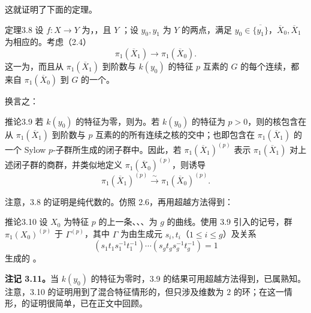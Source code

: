 这就证明了下面的定理。
\begin{SGAresult}{定理}{3.8}
设 $f:X\to Y$ 为，，且 $Y$ ；设 $y_0,y_1$ 为 $Y$ 的两点，满足 $y_0\in\overline{\{y_1\}}$，$\overline X_0,\overline X_1$ 为相应的。考虑（2.4）
\[
\pi_1(\overline X_1)\longrightarrow\pi_1(\overline X_0).
\]
这一为，而且从 $\pi_1(\overline X_1)$ 到阶数与 $k(y_0)$ 的特征 $p$ 互素的 $G$ 的每个连续，都来自 $\pi_1(\overline X_0)$ 到 $G$ 的一个。
\end{SGAresult}
换言之：
\begin{SGAresult}{推论}{3.9}
若 $k(y_0)$ 的特征为零，则为。若 $k(y_0)$ 的特征为 $p>0$，则的核包含在从 $\pi_1(\overline X_1)$ 到阶数与 $p$ 互素的的所有连续之核的交中；也即包含在  $\pi_1(\overline X_1)$ 的一个 Sylow $p$-子群所生成的闭子群中。因此，若 $\pi_1(\overline X_1)^{(p)}$ 表示 $\pi_1(\overline X_1)$ 对上述闭子群的商群，并类似地定义 $\pi_1(\overline X_0)^{(p)}$，则诱导
\[
\pi_1(\overline X_1)^{(p)}\xrightarrow{\sim}\pi_1(\overline X_0)^{(p)}.
\]
\end{SGAresult}
注意，3.8 的证明是纯代数的。仿照 2.6，再用超越方法得到：
\begin{SGAresult}{推论}{3.10}
设 $X_0$ 为特征 $p$ 的上一条、、、为 $g$ 的曲线。使用 3.9 引入的记号，群 $\pi_1(X_0)^{(p)}$ 于 $\Gamma^{(p)}$，其中 $\Gamma$ 为由生成元 $s_i,t_i$（$1\leq i\leq g$）及关系
\[
(s_1t_1s_1^{-1}t_1^{-1})\cdots(s_gt_gs_g^{-1}t_g^{-1})=1
\]
生成的 。
\end{SGAresult}
\textbf{注记 3.11。}当 $k(y_0)$ 的特征为零时，3.9 的结果可用超越方法得到，已属熟知。注意，3.10 的证明用到了混合特征情形的，但只涉及维数为 $2$ 的环；在这一情形，的证明很简单，已在正文中回顾。

